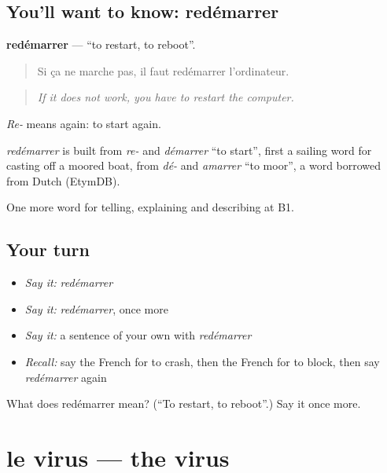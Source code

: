 \subsection*{You'll want to know: redémarrer}
\textbf{redémarrer} — \textquotedblleft{}to restart, to reboot\textquotedblright{}.

\begin{quote}
Si ça ne marche pas, il faut redémarrer l'ordinateur.
\end{quote}

\begin{quote}
\emph{If it does not work, you have to restart the computer.}
\end{quote}

\emph{Re-} means again: to start again.

\begin{cousinweb}
\emph{redémarrer} is built from \emph{re-} and \emph{démarrer} \textquotedblleft{}to start\textquotedblright{}, first a sailing word for casting off a moored boat, from \emph{dé-} and \emph{amarrer} \textquotedblleft{}to moor\textquotedblright{}, a word borrowed from Dutch (EtymDB).
\end{cousinweb}

\begin{grammarlens}[title={What you've built}]
One more word for telling, explaining and describing at B1.
\end{grammarlens}

\subsection*{Your turn}
\begin{itemize}
\raggedright
  \item \emph{Say it:} \emph{redémarrer}
  \item \emph{Say it:} \emph{redémarrer}, once more
  \item \emph{Say it:} a sentence of your own with \emph{redémarrer}
  \item \emph{Recall:} say the French for to crash, then the French for to block, then say \emph{redémarrer} again
\end{itemize}

\begin{tcolorbox}[breakable,colback=teal!4,colframe=teal!35!black,title={Before you move on}]
What does redémarrer mean? (\textquotedblleft{}To restart, to reboot\textquotedblright{}.) Say it once more.
\end{tcolorbox}
\section[le virus]{le virus — the virus}

